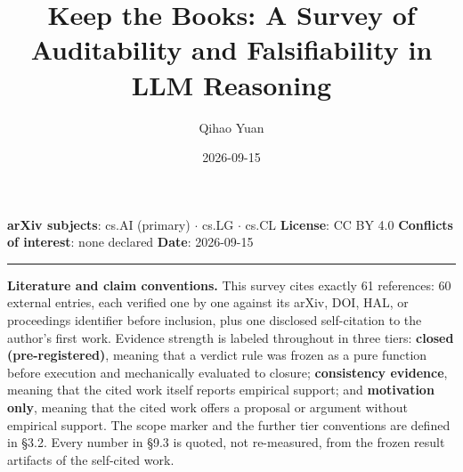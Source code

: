 \documentclass[11pt,a4paper]{article}
\title{Keep the Books: A Survey of Auditability and Falsifiability in LLM Reasoning}
\author{Qihao Yuan}
\date{2026-09-15}
\begin{document}
\maketitle
\thispagestyle{empty}
\vspace{0.5em}
\noindent\textbf{arXiv subjects}: cs.AI (primary) $\cdot$ cs.LG $\cdot$ cs.CL \quad \textbf{License}: CC BY 4.0 \quad \textbf{Conflicts of interest}: none declared \quad \textbf{Date}: 2026-09-15
\vspace{0.5em}
\hrule
\vspace{0.8em}

\noindent \textbf{Literature and claim conventions.} This survey cites exactly 61 references: 60 external entries, each verified one by one against its arXiv, DOI, HAL, or proceedings identifier before inclusion, plus one disclosed self-citation to the author's first work. Evidence strength is labeled throughout in three tiers: \textbf{closed (pre-registered)}, meaning that a verdict rule was frozen as a pure function before execution and mechanically evaluated to closure; \textbf{consistency evidence}, meaning that the cited work itself reports empirical support; and \textbf{motivation only}, meaning that the cited work offers a proposal or argument without empirical support. The scope marker and the further tier conventions are defined in §3.2. Every number in §9.3 is quoted, not re-measured, from the frozen result artifacts of the self-cited work.
\end{document}

